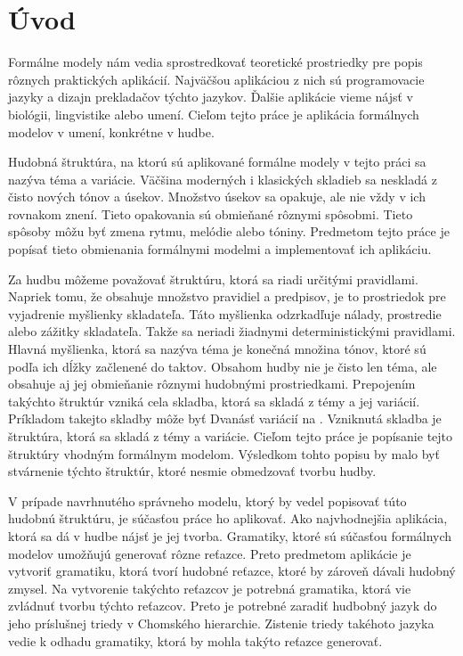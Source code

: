 \newtheorem{definition}{Definícia}[section]
\newtheorem{example}{Príklad}[section]

\def\UrlBreaks{\do\/\do-}

\chapter{Úvod}
Formálne modely nám vedia sprostredkovať teoretické prostriedky pre popis rôznych praktických aplikácií. Najväčšou aplikáciou z nich sú programovacie jazyky a dizajn prekladačov týchto jazykov. Ďalšie aplikácie vieme nájsť v biológii, lingvistike alebo umení. Cieľom tejto práce je aplikácia formálnych modelov v umení, konkrétne v hudbe.

Hudobná štruktúra, na ktorú sú aplikované formálne modely v tejto práci sa nazýva téma a variácie. Väčšina moderných i klasických skladieb sa neskladá z čisto nových tónov a úsekov. Množstvo úsekov sa opakuje, ale nie vždy v ich rovnakom znení. Tieto opakovania sú obmieňané rôznymi spôsobmi. Tieto spôsoby môžu byť zmena rytmu, melódie alebo tóniny. Predmetom tejto práce je popísať tieto obmienania formálnymi modelmi a implementovať ich aplikáciu.

Za hudbu môžeme považovať štruktúru, ktorá sa riadi určitými pravidlami. Napriek tomu, že obsahuje množstvo pravidiel a predpisov, je to prostriedok pre vyjadrenie myšlienky skladateľa. Táto myšlienka odzrkadľuje nálady, prostredie alebo zážitky skladateľa. Takže sa neriadi žiadnymi deterministickými pravidlami. Hlavná myšlienka, ktorá sa nazýva téma je konečná množina tónov, ktoré sú podľa ich dĺžky začlenené do taktov. Obsahom hudby nie je čisto len téma, ale obsahuje aj jej obmieňanie rôznymi hudobnými prostriedkami. Prepojením takýchto štruktúr vzniká cela skladba, ktorá sa skladá z témy a jej variácií. Príkladom takejto skladby môže byť Dvanásť variácií na . Vzniknutá skladba je štruktúra, ktorá sa skladá z témy a variácie. Cieľom tejto práce je popísanie tejto štruktúry vhodným formálnym modelom. Výsledkom tohto popisu by malo byť stvárnenie týchto štruktúr, ktoré nesmie obmedzovať tvorbu hudby.

V prípade navrhnutého správneho modelu, ktorý by vedel popisovať túto hudobnú štruktúru, je súčasťou práce ho aplikovať. Ako najvhodnejšia aplikácia, ktorá sa dá v hudbe nájsť je jej tvorba. Gramatiky, ktoré sú súčasťou formálnych modelov umožňujú generovať rôzne reťazce. Preto predmetom aplikácie je vytvoriť gramatiku, ktorá tvorí hudobné reťazce, ktoré by zároveň dávali hudobný zmysel. Na vytvorenie takýchto reťazcov je potrebná gramatika, ktorá vie zvládnuť tvorbu týchto reťazcov. Preto je potrebné zaradiť hudbobný jazyk do jeho príslušnej triedy v Chomského hierarchie. Zistenie triedy takéhoto jazyka vedie k odhadu gramatiky, ktorá by mohla takýto reťazce generovať. 

